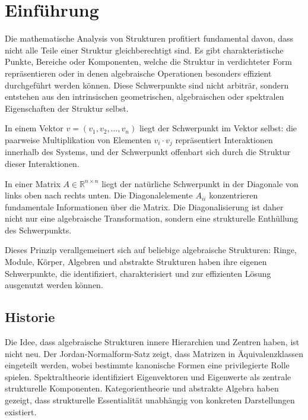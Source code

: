 \documentclass[a4paper,12pt]{article}
\theoremstyle{definition}
\begin{document}
\tableofcontents

\newpage

\section{Einführung}

Die mathematische Analysis von Strukturen profitiert fundamental davon, dass nicht alle Teile einer Struktur gleichberechtigt sind. Es gibt charakteristische Punkte, Bereiche oder Komponenten, welche die Struktur in verdichteter Form repräsentieren oder in denen algebraische Operationen besonders effizient durchgeführt werden können. Diese Schwerpunkte sind nicht arbiträr, sondern entstehen aus den intrinsischen geometrischen, algebraischen oder spektralen Eigenschaften der Struktur selbst.

In einem Vektor $v = (v_1, v_2, \ldots, v_n)$ liegt der Schwerpunkt im Vektor selbst: die paarweise Multiplikation von Elementen $v_i \cdot v_j$ repräsentiert Interaktionen innerhalb des Systems, und der Schwerpunkt offenbart sich durch die Struktur dieser Interaktionen.

In einer Matrix $A \in \mathbb{R}^{n \times n}$ liegt der natürliche Schwerpunkt in der Diagonale von links oben nach rechts unten. Die Diagonalelemente $A_{ii}$ konzentrieren fundamentale Informationen über die Matrix. Die Diagonalisierung ist daher nicht nur eine algebraische Transformation, sondern eine strukturelle Enthüllung des Schwerpunkts.

Dieses Prinzip verallgemeinert sich auf beliebige algebraische Strukturen: Ringe, Module, Körper, Algebren und abstrakte Strukturen haben ihre eigenen Schwerpunkte, die identifiziert, charakterisiert und zur effizienten Lösung ausgenutzt werden können.

\subsection{Historie}

Die Idee, dass algebraische Strukturen innere Hierarchien und Zentren haben, ist nicht neu. Der Jordan-Normalform-Satz zeigt, dass Matrizen in Äquivalenzklassen eingeteilt werden, wobei bestimmte kanonische Formen eine privilegierte Rolle spielen. Spektraltheorie identifiziert Eigenvektoren und Eigenwerte als zentrale strukturelle Komponenten. Kategorientheorie und abstrakte Algebra haben gezeigt, dass strukturelle Essentialität unabhängig von konkreten Darstellungen existiert.
\end{document}
